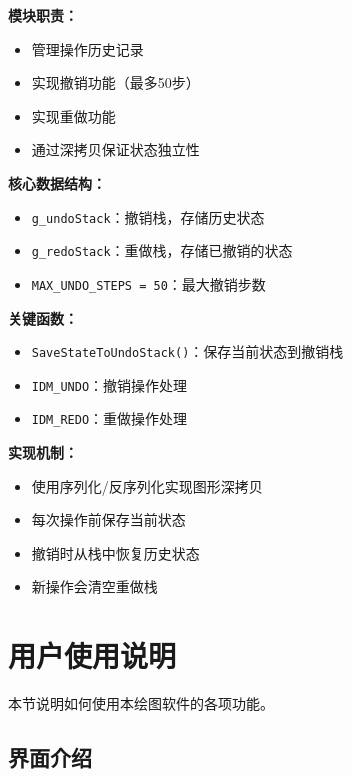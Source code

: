 \documentclass[12pt,a4paper]{article}
\begin{document}
\begin{tcolorbox}
\textbf{模块职责：}
\begin{itemize}
    \item 管理操作历史记录
    \item 实现撤销功能（最多50步）
    \item 实现重做功能
    \item 通过深拷贝保证状态独立性
\end{itemize}

\textbf{核心数据结构：}
\begin{itemize}
    \item \texttt{g\_undoStack}：撤销栈，存储历史状态
    \item \texttt{g\_redoStack}：重做栈，存储已撤销的状态
    \item \texttt{MAX\_UNDO\_STEPS = 50}：最大撤销步数
\end{itemize}

\textbf{关键函数：}
\begin{itemize}
    \item \texttt{SaveStateToUndoStack()}：保存当前状态到撤销栈
    \item \texttt{IDM\_UNDO}：撤销操作处理
    \item \texttt{IDM\_REDO}：重做操作处理
\end{itemize}

\textbf{实现机制：}
\begin{itemize}
    \item 使用序列化/反序列化实现图形深拷贝
    \item 每次操作前保存当前状态
    \item 撤销时从栈中恢复历史状态
    \item 新操作会清空重做栈
\end{itemize}
\end{tcolorbox}

\section{用户使用说明}

本节说明如何使用本绘图软件的各项功能。


\subsection{界面介绍}
\end{document}
